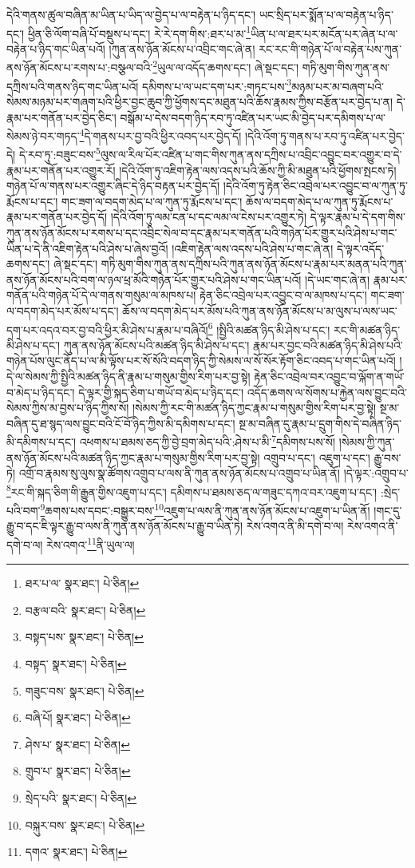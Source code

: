 དེའི་གནས་ཚུལ་བཞིན་མ་ཡིན་པ་ཡིད་ལ་བྱེད་པ་ལ་བརྟེན་པ་ཉིད་དང་། ཡང་སྲིད་པར་སྨོན་པ་ལ་བརྟེན་པ་ཉིད་དང་། ཕྱིན་ཅི་ལོག་བཞི་པོ་བསྡུས་པ་དང་། རེ་རེ་དག་གིས་:ཐར་པ་མ་\footnote{ཐར་པ་ལ་  སྣར་ཐང་།  པེ་ཅིན། }ཡིན་པ་ལ་ཐར་པར་མངོན་པར་ཞེན་པ་ལ་བརྟེན་པ་ཉིད་གང་ཡིན་པའོ། །ཀུན་ནས་ཉོན་མོངས་པ་འབྲིང་གང་ཞེ་ན། རང་རང་གི་གཉེན་པོ་ལ་བརྟེན་པས་ཀུན་ནས་ཉོན་མོངས་པ་རགས་པ་:བསྩལ་བའི་\footnote{བརྩལ་བའི་  སྣར་ཐང་།  པེ་ཅིན། }ཡུལ་ལ་འདོད་ཆགས་དང་། ཞེ་སྡང་དང་། གཏི་མུག་གིས་ཀུན་ནས་དཀྲིས་པའི་གནས་ཉིད་གང་ཡིན་པའོ། དམིགས་པ་ལ་ཡང་དག་པར་:གཏང་པས་\footnote{བསྟད་པས་  སྣར་ཐང་།  པེ་ཅིན། }མཉམ་པར་མ་བཞག་པའི་སེམས་མཉམ་པར་གཞག་པའི་ཕྱིར་བྱང་ཆུབ་ཀྱི་ཕྱོགས་དང་མཐུན་པའི་ཆོས་རྣམས་ཀྱིས་བརྩོན་པར་བྱེད་པ་ན། དེ་རྣམ་པར་གནོན་པར་བྱེད་ཅིང་། བསྒོམ་པ་དེས་བདག་ཉིད་རབ་ཏུ་འཛིན་པར་ཡང་མི་བྱེད་པར་དམིགས་པ་ལ་སེམས་ཉེ་བར་གཏད་\footnote{བསྟད་  སྣར་ཐང་།  པེ་ཅིན། }དེ་གནས་པར་བྱ་བའི་ཕྱིར་འབད་པར་བྱེད་དོ། །དེའི་འོག་ཏུ་གནས་པ་རབ་ཏུ་འཛིན་པར་བྱེད་དེ། དེ་རབ་ཏུ་:བཟུང་བས་\footnote{གཟུང་བས་  སྣར་ཐང་།  པེ་ཅིན། }ལུས་ལ་རིལ་པོར་འཛིན་པ་གང་གིས་ཀུན་ནས་དཀྲིས་པ་འབྲིང་འབྱུང་བར་འགྱུར་བ་དེ་རྣམ་པར་གནོན་པར་འགྱུར་རོ། །དེའི་འོག་ཏུ་འཇིག་རྟེན་ལས་འདས་པའི་ཆོས་ཀྱི་མི་མཐུན་པའི་ཕྱོགས་སྤངས་ཏེ། གཉེན་པོ་ལ་གནས་པར་འགྱུར་ཞིང་དེ་ཉིད་བརྟན་པར་བྱེད་དོ། །དེའི་འོག་ཏུ་རྟེན་ཅིང་འབྲེལ་པར་འབྱུང་བ་ལ་ཀུན་ཏུ་རྨོངས་པ་དང་། གང་ཟག་ལ་བདག་མེད་པ་ལ་ཀུན་ཏུ་རྨོངས་པ་དང་། ཆོས་ལ་བདག་མེད་པ་ལ་ཀུན་ཏུ་རྨོངས་པ་རྣམ་པར་གནོན་པར་བྱེད་དོ། །དེའི་འོག་ཏུ་ལམ་ངན་པ་དང་ལམ་ལ་ངེས་པར་འགྱུར་ཏེ། དེ་ལྟར་རྣམ་པ་དེ་དག་གིས་ཀུན་ནས་ཉོན་མོངས་པ་རགས་པ་དང་འབྲིང་སེལ་བ་དང་རྣམ་པར་གནོན་པའི་གཉེན་པོར་གྱུར་པའི་ཤེས་པ་གང་ཡིན་པ་དེ་ནི་འཇིག་རྟེན་པའི་ཤེས་པ་ཞེས་བྱའོ། །འཇིག་རྟེན་ལས་འདས་པའི་ཤེས་པ་གང་ཞེ་ན། དེ་ལྟར་འདོད་ཆགས་དང་། ཞེ་སྡང་དང་། གཏི་མུག་གིས་ཀུན་ནས་དཀྲིས་པའི་ཀུན་ནས་ཉོན་མོངས་པ་རྣམ་པར་མནན་པའི་ཀུན་ནས་ཉོན་མོངས་པའི་བག་ལ་ཉལ་ཕྲ་མོའི་གཉེན་པོར་གྱུར་པའི་ཤེས་པ་གང་ཡིན་པའོ། །དེ་ཡང་གང་ཞེ་ན། རྣམ་པར་གནོན་པའི་གཉེན་པོ་དེ་ལ་གནས་གསུམ་ལ་མཁས་པ། རྟེན་ཅིང་འབྲེལ་པར་འབྱུང་བ་ལ་མཁས་པ་དང་། གང་ཟག་ལ་བདག་མེད་པར་མོས་པ་དང་། ཆོས་ལ་བདག་མེད་པར་མོས་པའི་ཀུན་ནས་ཉོན་མོངས་པ་མ་ལུས་པ་ལས་ཡང་དག་པར་འདའ་བར་བྱ་བའི་ཕྱིར་མི་ཤེས་པ་རྣམ་པ་བཞིའོ།\footnote{བཞི་པོ།  སྣར་ཐང་།  པེ་ཅིན། } །སྤྱིའི་མཚན་ཉིད་མི་ཤེས་པ་དང་། རང་གི་མཚན་ཉིད་མི་ཤེས་པ་དང་། ཀུན་ནས་ཉོན་མོངས་པའི་མཚན་ཉིད་མི་ཤེས་པ་དང་། རྣམ་པར་བྱང་བའི་མཚན་ཉིད་མི་ཤེས་པའི་གཉེན་པོས་ལུང་ནོད་པ་ལ་མི་ལྟོས་པར་སོ་སོའི་བདག་ཉིད་ཀྱི་སེམས་ལ་སོ་སོར་རྟོག་ཅིང་འབད་པ་གང་ཡིན་པའོ། །དེ་ལ་སེམས་ཀྱི་སྤྱིའི་མཚན་ཉིད་ནི་རྣམ་པ་གསུམ་གྱིས་རིག་པར་བྱ་སྟེ། རྟེན་ཅིང་འབྲེལ་བར་འབྱུང་བ་ལྐོག་ན་གཡོ་བ་མེད་པ་ཉིད་དང་། དེ་ལྟར་གྱི་སྐད་ཅིག་པ་གཡོ་བ་མེད་པ་ཉིད་དང་། འདོད་ཆགས་ལ་སོགས་པ་རྐྱེན་ལས་བྱུང་བའི་སེམས་ཀྱིས་མ་བྱས་པ་ཉིད་ཀྱིས་སོ། །སེམས་ཀྱི་རང་གི་མཚན་ཉིད་ཀྱང་རྣམ་པ་གསུམ་གྱིས་རིག་པར་བྱ་སྟེ། སྔ་མ་བཞིན་དུ་ཐ་སྙད་ལས་བྱུང་བའི་ངོ་བོ་ཉིད་ཀྱིས་མི་དམིགས་པ་དང་། སྔ་མ་བཞིན་དུ་རྣམ་པ་དྲུག་གིས་དེ་བཞིན་ཉིད་མི་དམིགས་པ་དང་། འཕགས་པ་ཐམས་ཅད་ཀྱི་བྱེ་བྲག་མེད་པའི་:ཤེས་པ་མི་\footnote{ཤེས་པ་  སྣར་ཐང་།  པེ་ཅིན། }དམིགས་པས་སོ། །སེམས་ཀྱི་ཀུན་ནས་ཉོན་མོངས་པའི་མཚན་ཉིད་ཀྱང་རྣམ་པ་གསུམ་གྱིས་རིག་པར་བྱ་སྟེ། འགྲུབ་པ་དང་། འཇུག་པ་དང་། རྒྱུ་བས་ཏེ། འགྲོ་བ་རྣམས་སུ་ལུས་སྣ་ཚོགས་འགྲུབ་པ་ལས་ནི་ཀུན་ནས་ཉོན་མོངས་པ་འགྲུབ་པ་ཡིན་ནོ། །དེ་ལྟར་:འགྲུབ་པ་\footnote{གྲུབ་པ་  སྣར་ཐང་།  པེ་ཅིན། }རང་གི་སྐད་ཅིག་གི་རྒྱུན་གྱིས་འཇུག་པ་དང་། དམིགས་པ་ཐམས་ཅད་ལ་གཟུང་དཀའ་བར་འཇུག་པ་དང་། :སྲེད་པའི་བག་\footnote{སྲེད་པའི་  སྣར་ཐང་།  པེ་ཅིན། }ཆགས་པས་དབང་:བསྒྱུར་བས་\footnote{བསྐུར་བས་  སྣར་ཐང་།  པེ་ཅིན། }འཇུག་པ་ལས་ནི་ཀུན་ནས་ཉོན་མོངས་པ་འཇུག་པ་ཡིན་ནོ། །གང་དུ་རྒྱུ་བ་དང་ཇི་ལྟར་རྒྱུ་བ་ལས་ནི་ཀུན་ནས་ཉོན་མོངས་པ་རྒྱུ་བ་ཡིན་ཏེ། རེས་འགའ་ནི་མི་དགེ་བ་ལ། རེས་འགའ་ནི་དགེ་བ་ལ། རེས་འགའ་\footnote{དགའ་  སྣར་ཐང་།  པེ་ཅིན། }ནི་ཡུལ་ལ། 